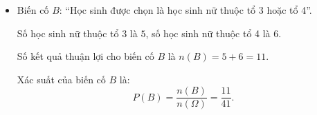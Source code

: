 \begin{bt}
{\begin{enumerate}[a)]
\begin{itemize}
				Số học sinh thuộc tổ 1 là $9$ học sinh, nên số kết quả thuận lợi cho $A$ là $n(A) = 9$.
				
				Xác suất của biến cố $A$ là:
				$$P(A) = \dfrac{n(A)}{n(\Omega)} = \dfrac{9}{41}.$$
				\item Biến cố $B$: ``Học sinh được chọn là học sinh nữ thuộc tổ 3 hoặc tổ 4''.
				
				Số học sinh nữ thuộc tổ 3 là $5$, số học sinh nữ thuộc tổ 4 là $6$.
				
				Số kết quả thuận lợi cho biến cố $B$ là $n(B) = 5 + 6 = 11$.
				
				Xác suất của biến cố $B$ là:
				$$P(B) = \dfrac{n(B)}{n(\Omega)} = \dfrac{11}{41}.$$
			\end{itemize}
		\end{enumerate}
	}
\end{bt}

